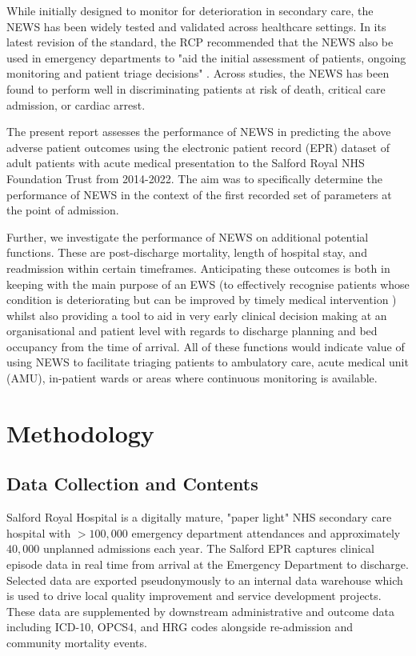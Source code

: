 \documentclass[10pt,journal, compsoc]{IEEEtran}
\begin{document}
While initially designed to monitor for deterioration in secondary care, the NEWS has been widely tested and validated across healthcare settings. In its latest revision of the standard, the RCP recommended that the NEWS also be used in emergency departments to "aid the initial assessment of patients, ongoing monitoring and patient triage decisions" \cite[pp.~18]{RCP17}. Across studies, the NEWS has been found to perform well in discriminating patients at risk of death, critical care admission, or cardiac arrest.

The present report assesses the performance of NEWS in predicting the above adverse patient outcomes using the electronic patient record (EPR) dataset of adult patients with acute medical presentation to the Salford Royal NHS Foundation Trust from 2014-2022. The aim was to specifically determine the performance of NEWS in the context of the first recorded set of parameters at the point of admission.

Further, we investigate the performance of NEWS on additional potential functions. These are post-discharge mortality, length of hospital stay, and readmission within certain timeframes. Anticipating these outcomes is both in keeping with the main purpose of an EWS (to effectively recognise patients whose condition is deteriorating but can be improved by timely medical intervention \cite[pp.~4]{Smith13}) whilst also providing a tool to aid in very early clinical decision making at an organisational and patient level with regards to discharge planning and bed occupancy from the time of arrival. All of these functions would indicate value of using NEWS to facilitate triaging patients to ambulatory care, acute medical unit (AMU), in-patient wards or areas where continuous monitoring is available.

\section{Methodology}
\subsection{Data Collection and Contents}
Salford Royal Hospital is a digitally mature, "paper light" NHS secondary care hospital with $>100,000$ emergency department attendances and approximately $40,000$ unplanned admissions each year. The Salford EPR captures clinical episode data in real time from arrival at the Emergency Department to discharge. Selected data are exported pseudonymously to an internal data warehouse which is used to drive local quality improvement and service development projects. These data are supplemented by downstream administrative and outcome data including ICD-10, OPCS4, and HRG codes alongside re-admission and community mortality events.
\end{document}
